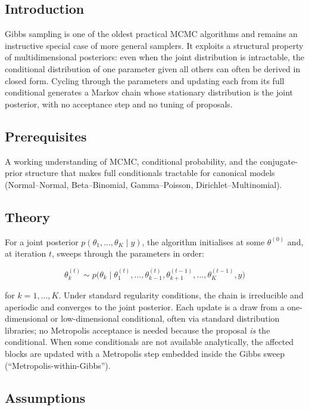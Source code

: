 \documentclass[
]{article}
\author{}
\date{\vspace{-2.5em}}
\begin{document}
\subsection{Introduction}\label{introduction}

Gibbs sampling is one of the oldest practical MCMC algorithms and
remains an instructive special case of more general samplers. It
exploits a structural property of multidimensional posteriors: even when
the joint distribution is intractable, the conditional distribution of
one parameter given all others can often be derived in closed form.
Cycling through the parameters and updating each from its full
conditional generates a Markov chain whose stationary distribution is
the joint posterior, with no acceptance step and no tuning of proposals.

\subsection{Prerequisites}\label{prerequisites}

A working understanding of MCMC, conditional probability, and the
conjugate-prior structure that makes full conditionals tractable for
canonical models (Normal--Normal, Beta--Binomial, Gamma--Poisson,
Dirichlet--Multinomial).

\subsection{Theory}\label{theory}

For a joint posterior \(p(\theta_1, \dots, \theta_K \mid y)\), the
algorithm initialises at some \(\theta^{(0)}\) and, at iteration \(t\),
sweeps through the parameters in order:

\[\theta_k^{(t)} \sim p\bigl(\theta_k \mid \theta_1^{(t)}, \dots, \theta_{k-1}^{(t)}, \theta_{k+1}^{(t-1)}, \dots, \theta_K^{(t-1)}, y\bigr)\]

for \(k = 1, \dots, K\). Under standard regularity conditions, the chain
is irreducible and aperiodic and converges to the joint posterior. Each
update is a draw from a one-dimensional or low-dimensional conditional,
often via standard distribution libraries; no Metropolis acceptance is
needed because the proposal \emph{is} the conditional. When some
conditionals are not available analytically, the affected blocks are
updated with a Metropolis step embedded inside the Gibbs sweep
(``Metropolis-within-Gibbs'').

\subsection{Assumptions}\label{assumptions}
\end{document}
